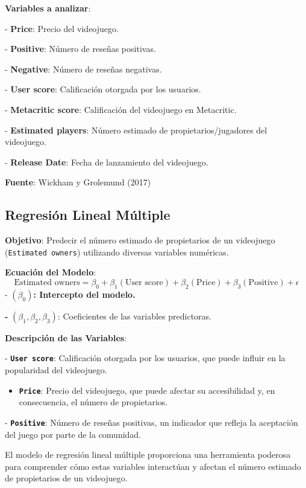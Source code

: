 \documentclass[
  letterpaper,
  DIV=11,
  numbers=noendperiod]{scrreprt}
\providecommand{\tightlist}{%
  \setlength{\itemsep}{0pt}\setlength{\parskip}{0pt}}\usepackage{longtable,booktabs,array}
\begin{document}
\textbf{Variables a analizar}:

- \textbf{Price}: Precio del videojuego.

- \textbf{Positive}: Número de reseñas positivas.

- \textbf{Negative}: Número de reseñas negativas.

- \textbf{User score}: Calificación otorgada por los usuarios.

- \textbf{Metacritic score}: Calificación del videojuego en Metacritic.

- \textbf{Estimated players}: Número estimado de propietarios/jugadores
del videojuego.

- \textbf{Release Date}: Fecha de lanzamiento del videojuego.

\textbf{Fuente}: Wickham y Grolemund (2017)

\hypertarget{regresiuxf3n-lineal-muxfaltiple}{%
\subsection{Regresión Lineal
Múltiple}\label{regresiuxf3n-lineal-muxfaltiple}}

\textbf{Objetivo}: Predecir el número estimado de propietarios de un
videojuego (\texttt{Estimated\ owners}) utilizando diversas variables
numéricas.

\textbf{Ecuación del Modelo}: \[
\text{Estimated owners} = \beta_0 + \beta_1 (\text{User score}) + \beta_2 (\text{Price}) + \beta_3 (\text{Positive}) + \epsilon
\] - \((\beta_0)\)\textbf{: Intercepto del modelo.}

\textbf{-} \((\beta_1, \beta_2, \beta_3)\): Coeficientes de las
variables predictoras.

\textbf{Descripción de las Variables}:

- \textbf{\texttt{User\ score}}: Calificación otorgada por los usuarios,
que puede influir en la popularidad del videojuego.

\begin{itemize}
\tightlist
\item
  \textbf{\texttt{Price}}: Precio del videojuego, que puede afectar su
  accesibilidad y, en consecuencia, el número de propietarios.
\end{itemize}

- \textbf{\texttt{Positive}}: Número de reseñas positivas, un indicador
que refleja la aceptación del juego por parte de la comunidad.

El modelo de regresión lineal múltiple proporciona una herramienta
poderosa para comprender cómo estas variables interactúan y afectan el
número estimado de propietarios de un videojuego.
\end{document}
